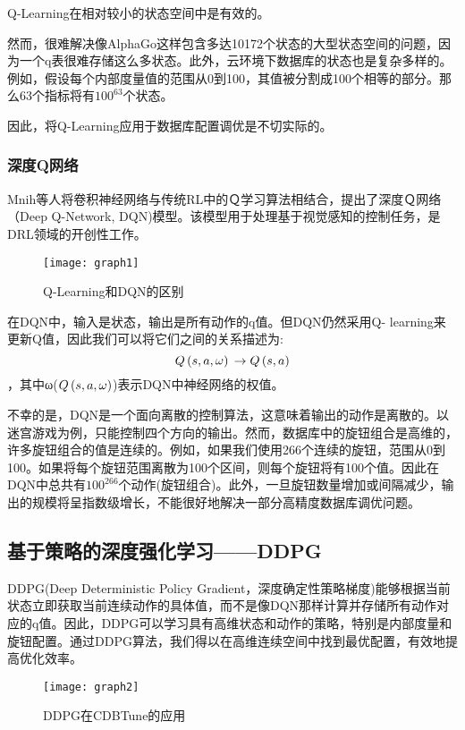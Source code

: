 \documentclass[a4paper,12pt]{article}
\begin{document}
Q-Learning在相对较小的状态空间中是有效的。

然而，很难解决像AlphaGo这样包含多达10172个状态的大型状态空间的问题，因为一个q表很难存储这么多状态。此外，云环境下数据库的状态也是复杂多样的。例如，假设每个内部度量值的范围从0到100，其值被分割成100个相等的部分。那么63个指标将有$100^{63}$个状态。

因此，将Q-Learning应用于数据库配置调优是不切实际的。

\subsubsection{深度Q网络}
Mnih等人将卷积神经网络与传统RL中的Ｑ学习算法相结合，提出了深度Ｑ网络（Deep Q-Network, DQN)模型。该模型用于处理基于视觉感知的控制任务，是DRL领域的开创性工作\cite{05}。

\begin{figure}
\centering
\texttt{[image: graph1]}
\caption{Q-Learning和DQN的区别\cite{03}}
\end{figure}

在DQN中，输入是状态，输出是所有动作的q值。但DQN仍然采用Q- learning来更新Q值，因此我们可以将它们之间的关系描述为:
$$Q\left( {s,{\rm{ }}a,{\rm{ }}\omega } \right){\rm{ }} \to {\rm{ }}Q\left( {s,{\rm{ }}a} \right)$$
，其中ω($Q\left( {s,{\rm{ }}a,{\rm{ }}\omega } \right)$)表示DQN中神经网络的权值。

不幸的是，DQN是一个面向离散的控制算法，这意味着输出的动作是离散的。以迷宫游戏为例，只能控制四个方向的输出。然而，数据库中的旋钮组合是高维的，许多旋钮组合的值是连续的。例如，如果我们使用266个连续的旋钮，范围从0到100。如果将每个旋钮范围离散为100个区间，则每个旋钮将有100个值。因此在DQN中总共有$100^{266}$个动作(旋钮组合)。此外，一旦旋钮数量增加或间隔减少，输出的规模将呈指数级增长，不能很好地解决一部分高精度数据库调优问题\cite{05}。

\subsection{基于策略的深度强化学习——DDPG}

DDPG(Deep Deterministic Policy Gradient，深度确定性策略梯度)能够根据当前状态立即获取当前连续动作的具体值，而不是像DQN那样计算并存储所有动作对应的q值。因此，DDPG可以学习具有高维状态和动作的策略，特别是内部度量和旋钮配置\cite{03}。通过DDPG算法，我们得以在高维连续空间中找到最优配置，有效地提高优化效率。

\begin{figure}
\centering
\texttt{[image: graph2]}
\caption{DDPG在CDBTune的应用\cite{03}}
\end{figure}
\end{document}
